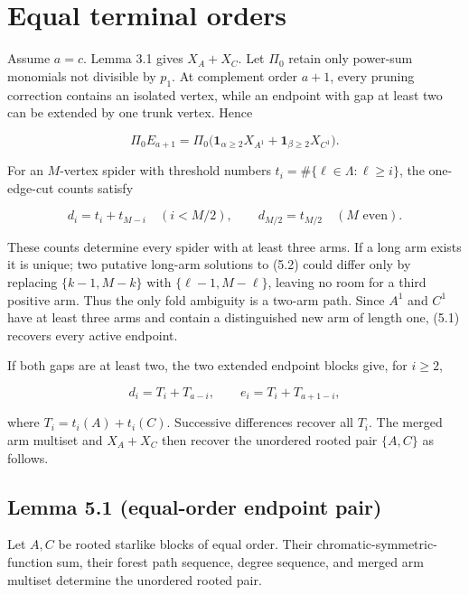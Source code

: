 \documentclass[11pt]{article}
\begin{document}
\section{Equal terminal orders}


Assume $a=c$. Lemma 3.1 gives $X_A+X_C$. Let $\Pi_0$ retain only power-sum monomials not divisible
by $p_1$. At complement order $a+1$, every pruning correction contains an isolated vertex, while an
endpoint with gap at least two can be extended by one trunk vertex. Hence

\begin{equation*}
\Pi_0E_{a+1}=
\Pi_0\bigl(
\mathbf1_{\alpha\geq2}X_{A^1}+
\mathbf1_{\beta\geq2}X_{C^1}
\bigr).
\tag{5.1}
\end{equation*}


For an $M$-vertex spider with threshold numbers
$t_i=\#\{\ell\in\Lambda:\ell\geq i\}$, the one-edge-cut counts satisfy

\begin{equation*}
d_i=t_i+t_{M-i}\quad(i<M/2),
\qquad d_{M/2}=t_{M/2}\quad(M\text{ even}).
\tag{5.2}
\end{equation*}


These counts determine every spider with at least three arms. If a long arm exists it is unique;
two putative long-arm solutions to (5.2) could differ only by replacing
$\{k-1,M-k\}$ with $\{\ell-1,M-\ell\}$, leaving no room for a third positive arm. Thus the only
fold ambiguity is a two-arm path. Since $A^1$ and $C^1$ have at least three arms and contain a
distinguished new arm of length one, (5.1) recovers every active endpoint.

If both gaps are at least two, the two extended endpoint blocks give, for $i\geq2$,

\begin{equation*}
d_i=T_i+T_{a-i},\qquad e_i=T_i+T_{a+1-i},
\tag{5.3}
\end{equation*}


where $T_i=t_i(A)+t_i(C)$. Successive differences recover all $T_i$. The merged arm multiset and
$X_A+X_C$ then recover the unordered rooted pair $\{A,C\}$ as follows.

\Needspace{0.13\textheight}
\subsection*{Lemma 5.1 (equal-order endpoint pair)}


Let $A,C$ be rooted starlike blocks of equal order. Their chromatic-symmetric-function sum, their
forest path sequence, degree sequence, and merged arm multiset determine the unordered rooted pair.
\end{document}
